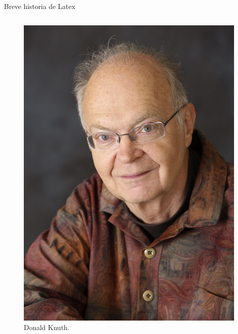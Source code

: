 \documentclass[aspectratio=169, 10pt]{beamer}
\begin{document}
\begin{frame}{Breve historia de Latex}
\begin{columns}
    \begin{column}{.28\linewidth}
        \begin{itemize}
        \justifying
        \begin{figure}
                \centering
                \includegraphics[scale=0.20]{Knuth_donald.jpg} 
               \hspace{-8mm} \caption*{Donald Knuth.}
                \label{}
        \end{figure}    
    \end{itemize}
    \end{column}


\end{columns}
\end{frame}
\end{document}

